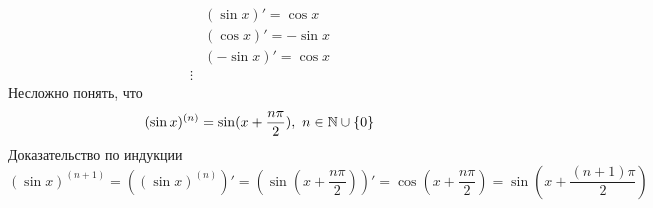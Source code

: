 \begin{example}
	\begin{align*}
		&{(\sin x)' = \cos x}
		\\
		&{(\cos x)' = -\sin x}
		\\
		&{(-\sin x)' = \cos x}
		\\
		\vdots
	\end{align*}
	Несложно понять, что
	$$
		(\sin x)^{(n)} = \sin (x + \frac{n\pi}{2}),\ n \in \mathbb{N} \cup \{0\}
	$$
	Доказательство по индукции
	$$
		(\sin x)^{(n + 1)} = \left((\sin x)^{(n)}\right)' = \left(\sin(x + \frac{n\pi}{2})\right)' = \cos(x + \frac{n\pi}{2}) = \sin\left(x + \frac{(n + 1)\pi}{2}\right)
	$$
\end{example}